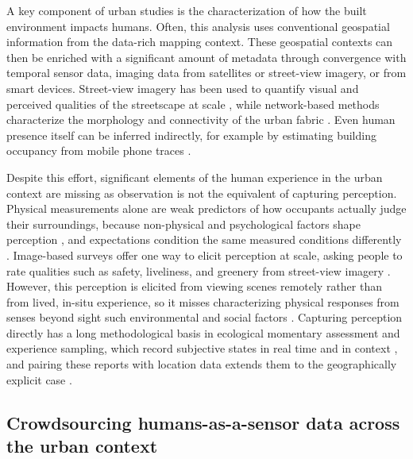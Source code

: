 \documentclass[]{interact}
\begin{document}

A key component of urban studies is the characterization of how the built environment impacts humans. 
Often, this analysis uses conventional geospatial information from the data-rich mapping context. 
These geospatial contexts can then be enriched with a significant amount of metadata through convergence with temporal sensor data, imaging data from satellites or street-view imagery, or from smart devices.
Street-view imagery has been used to quantify visual and perceived qualities of the streetscape at scale \citep{Ito2024-fs}, while network-based methods characterize the morphology and connectivity of the urban fabric \citep{Yap2023-xs}.
Even human presence itself can be inferred indirectly, for example by estimating building occupancy from mobile phone traces \citep{Barbour2019-py}.

Despite this effort, significant elements of the human experience in the urban context are missing as observation is not the equivalent of capturing perception.
Physical measurements alone are weak predictors of how occupants actually judge their surroundings, because non-physical and psychological factors shape perception \citep{Castaldo2018-ih}, and expectations condition the same measured conditions differently \citep{Schweiker2020-pw}.
Image-based surveys offer one way to elicit perception at scale, asking people to rate qualities such as safety, liveliness, and greenery from street-view imagery \citep{Ito2024-fs,Gu2025-fp}.
However, this perception is elicited from viewing scenes remotely rather than from lived, in-situ experience, so it misses characterizing physical responses from senses beyond sight such environmental and social factors \citep{Quintana2025-tn}.
Capturing perception directly has a long methodological basis in ecological momentary assessment and experience sampling, which record subjective states in real time and in context \citep{Stone1994-he,Christensen2003-zn}, and pairing these reports with location data extends them to the geographically explicit case \citep{Kirchner2016-dq}.

\subsection{Crowdsourcing humans-as-a-sensor data across the urban context}\label{sec:crowdsourcing}
\end{document}

